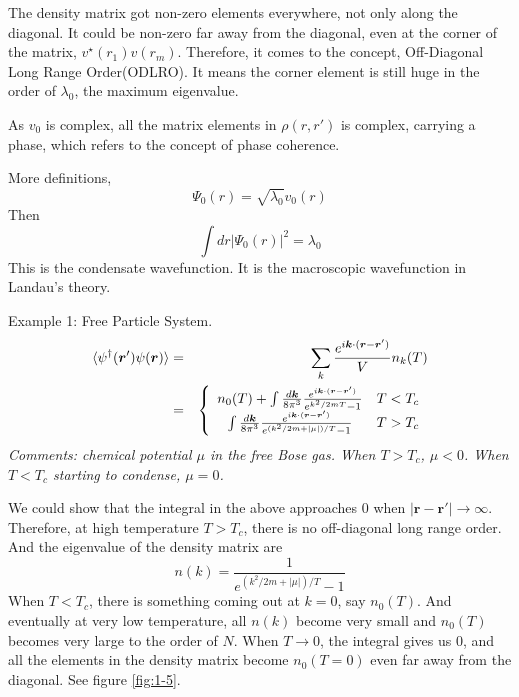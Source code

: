 The density matrix got non-zero elements everywhere, not only along the diagonal. It could be non-zero far away from the diagonal, even at the corner of the matrix, $v^\star(r_1)v(r_m)$. Therefore, it comes to the concept, Off-Diagonal Long Range Order(ODLRO). It means the corner element is still huge in the order of $\lambda_0$, the maximum eigenvalue. 

As $v_0$ is complex, all the matrix elements in $\rho(r,r')$ is complex, carrying a phase, which refers to the concept of phase coherence. 

More definitions,
\begin{equation}
\Psi_0(r) = \sqrt{\lambda_0} v_0(r)
\end{equation}
Then 
\begin{equation}
\int dr |\Psi_0(r)|^2 = \lambda_0
\end{equation}
This is the condensate wavefunction. It is the macroscopic wavefunction in Landau's theory. 

Example 1: Free Particle System.
\begin{eqnarray}
\braket{\psi^\dag(\bm r')\psi(\bm r)} &=& \sum_k \frac{e^{i \bm k \cdot (\bm r-\bm r')}}{V}n_k(T)\\
&=& \left\{\begin{array}{cc}
n_0(T) + \int \frac{d \bm k}{8\pi^3} \frac{e^{i \bm k \cdot (\bm r-\bm r')}}{e^{k^2/2mT}-1} & T < T_c\\
\int \frac{d \bm k}{8\pi^3} \frac{e^{i \bm k \cdot (\bm r-\bm r')}}{e^{(k^2/2m+|\mu|)/T}-1} & T > T_c\\
\end{array}\right. 
\end{eqnarray}
\textit{Comments: chemical potential $\mu$ in the free Bose gas.
When $T>T_c$, $\mu < 0$. When $T<T_c$ starting to condense, $\mu = 0$.}

We could show that the integral in the above approaches $0$ when $|\bm r-\bm r'|\rightarrow \infty$. 
Therefore, at high temperature $T>T_c$, there is no off-diagonal long range order. And the eigenvalue of the density matrix are 
\begin{equation}
n(k) = \frac{1}{e^{(k^2/2m+|\mu|)/T}-1} 
\end{equation}
When $T<T_c$, there is something coming out at $k=0$, say $n_0(T)$.
And eventually at very low temperature, all $n(k)$ become very small and $n_0(T)$ becomes very large to the order of $N$. 
When $T\rightarrow 0$, the integral gives us $0$, and all the elements in the density matrix become $n_0(T=0)$ even far away from the diagonal.
See figure \ref{fig:1-5}.

